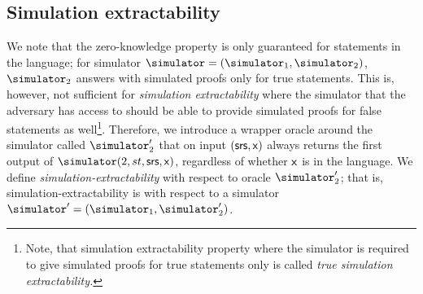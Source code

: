 
\subsection{Simulation extractability}
We note that the zero-knowledge property is only guaranteed for statements in the
language; for simulator $\simulator = (\simulator_1, \simulator_2)$, $\simulator_2$
answers with simulated proofs only for true statements.  This is, however, not sufficient
for \emph{simulation extractability} where the simulator that the adversary has access to
should be able to provide simulated proofs for false statements as well\footnote{Note,
  that simulation extractability property where the simulator is required to give
  simulated proofs for true statements only is called \emph{true simulation
    extractability.}}. Therefore, we introduce a wrapper oracle around the simulator
called $\simulator'_2$ that on input $(\mathsf{srs}, \mathsf{x})$ always returns the first output of
$\simulator (2, st, \srs, \inp)$, regardless of whether $\mathsf{x}$ is in the language. We
define \emph{simulation-extractability} with respect to oracle $\simulator_2'$; that is,
simulation-extractability is with respect to a simulator
$\simulator' = (\simulator_1, \simulator_2')$.
%

